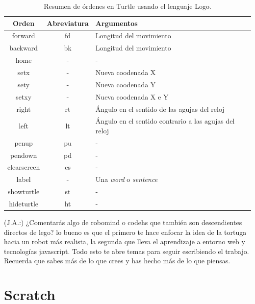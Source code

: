 \begin{table}[!ht]
	\begin{centering}
		\begin{tabular}{c|c|l}
Orden & Abreviatura & Argumentos\\
\hline
forward & fd & Longitud del movimiento\\
backward & bk & Longitud del movimiento\\
home & - & -\\
setx & - & Nueva coodenada X\\
sety & - & Nueva coodenada Y\\
setxy & - & Nueva coodenada X e Y\\
right & rt & Ángulo en el sentido de las agujas del reloj\\
left & lt & Ángulo en el sentido contrario a las agujas del reloj\\
penup & pu & -\\
pendown & pd & -\\
clearscreen & cs & -\\
label & - & Una \emph{word} o \emph{sentence}\\
showturtle & st & -\\
hideturtle & ht & -\\
\end{tabular}
	\caption{Resumen de órdenes en Turtle usando el lenguaje Logo.}
		\label{tab:turtle-lenguaje}
	\end{centering}
\end{table}



{\color{green}
(J.A.:) ¿Comentarás algo de robomind o codehs que también son descendientes directos de lego? lo bueno es que el primero te hace enfocar la idea de la tortuga hacia un robot más realista, la segunda que lleva el aprendizaje a entorno web y tecnologías javascript. Todo esto te abre temas para seguir escribiendo el trabajo. Recuerda que sabes más de lo que crees y has hecho más de lo que piensas.
}




\section{Scratch}
\label{sec:scratch}


